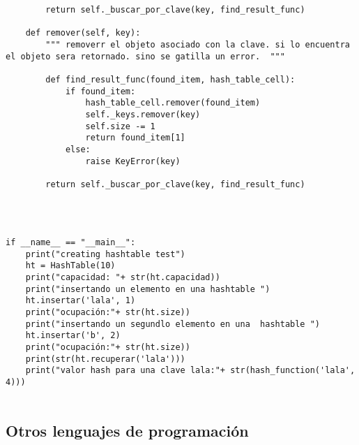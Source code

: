 \begin{lstlisting}
        return self._buscar_por_clave(key, find_result_func)

    def remover(self, key):
        """ removerr el objeto asociado con la clave. si lo encuentra el objeto sera retornado. sino se gatilla un error.  """

        def find_result_func(found_item, hash_table_cell):
            if found_item:
                hash_table_cell.remover(found_item)
                self._keys.remover(key)
                self.size -= 1
                return found_item[1]
            else:
                raise KeyError(key)

        return self._buscar_por_clave(key, find_result_func)




if __name__ == "__main__":
    print("creating hashtable test")
    ht = HashTable(10)
    print("capacidad: "+ str(ht.capacidad))
    print("insertando un elemento en una hashtable ")
    ht.insertar('lala', 1)
    print("ocupación:"+ str(ht.size))
    print("insertando un segundlo elemento en una  hashtable ")
    ht.insertar('b', 2)
    print("ocupación:"+ str(ht.size))
    print(str(ht.recuperar('lala')))
    print("valor hash para una clave lala:"+ str(hash_function('lala', 4)))
    
\end{lstlisting}



\subsection{Otros lenguajes de programación}

